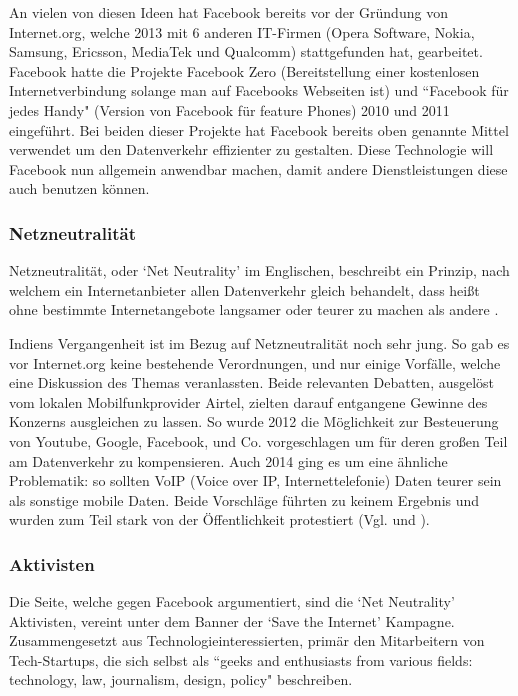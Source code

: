 \documentclass{article}
\begin{document}
An vielen von diesen Ideen hat Facebook bereits vor der Gründung von Internet.org, welche 2013 mit 6 anderen IT-Firmen (Opera Software, Nokia, Samsung, Ericsson, MediaTek und Qualcomm) stattgefunden hat, gearbeitet.
Facebook hatte die Projekte Facebook Zero (Bereitstellung einer kostenlosen Internetverbindung solange man auf Facebooks Webseiten ist) und ``Facebook für jedes Handy" (Version von Facebook für feature Phones) 2010 und 2011 eingeführt.
Bei beiden dieser Projekte hat Facebook bereits oben genannte Mittel verwendet um den Datenverkehr effizienter zu gestalten.
Diese Technologie will Facebook nun allgemein anwendbar machen, damit andere Dienstleistungen diese auch benutzen können.

\subsubsection{Netzneutralität}

Netzneutralität, oder `Net Neutrality' im Englischen, beschreibt ein Prinzip, nach welchem ein Internetanbieter allen Datenverkehr gleich behandelt, dass heißt ohne bestimmte Internetangebote langsamer oder teurer zu machen als andere \autocite{netzneutralität}.

\medskip

Indiens Vergangenheit ist im Bezug auf Netzneutralität noch sehr jung. So gab es vor Internet.org keine bestehende Verordnungen, und nur einige Vorfälle, welche eine Diskussion des Themas veranlassten.
Beide relevanten Debatten, ausgelöst vom lokalen Mobilfunkprovider Airtel, zielten darauf entgangene Gewinne des Konzerns ausgleichen zu lassen.
So wurde 2012 die Möglichkeit zur Besteuerung von Youtube, Google, Facebook, und Co. vorgeschlagen um für deren großen Teil am Datenverkehr zu kompensieren.
Auch 2014 ging es um eine ähnliche Problematik: so sollten VoIP (Voice over IP, Internettelefonie) Daten teurer sein als sonstige mobile Daten.
Beide Vorschläge führten zu keinem Ergebnis und wurden zum Teil stark von der Öffentlichkeit protestiert (Vgl. \textcite[253]{everydayLife} und \textcite{airtelVoip}).

\subsubsection{Aktivisten}

Die Seite, welche gegen Facebook argumentiert, sind die `Net Neutrality' Aktivisten, vereint unter dem Banner der `Save the Internet' Kampagne.
Zusammengesetzt aus Technologieinteressierten, primär den Mitarbeitern von Tech-Startups, die sich selbst als ``geeks and enthusiasts from various fields: technology, law, journalism, design, policy" \parencite{sti2015} beschreiben.
\end{document}
